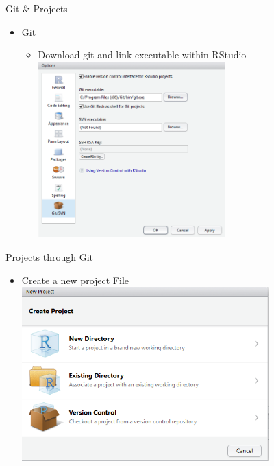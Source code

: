 \documentclass[
  ignorenonframetext,
]{beamer}
\providecommand{\tightlist}{%
  \setlength{\itemsep}{0pt}\setlength{\parskip}{0pt}}
\begin{document}
\begin{frame}{Git \& Projects}
\protect\hypertarget{git-projects}{}

\begin{itemize}
\tightlist
\item
  Git

  \begin{itemize}
  \tightlist
  \item
    Download git and link executable within RStudio
    \includegraphics[width=0.6\textwidth,height=\textheight]{../external/images/setup_1_rstudio_git.PNG}
  \end{itemize}
\end{itemize}

\end{frame}

\begin{frame}{Projects through Git}
\protect\hypertarget{projects-through-git}{}

\begin{itemize}
\tightlist
\item
  Create a new project File
  \includegraphics[width=0.75\textwidth,height=\textheight]{../external/images/setup_2_rstudio_project.PNG}
\end{itemize}

\end{frame}
\end{document}
